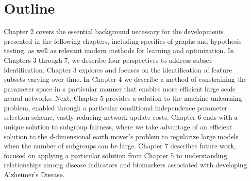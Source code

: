 \section{Outline}
Chapter 2 covers the essential background necessary for the developments presented in the following chapters, including specifics of graphs and hypothesis testing, as well as relevant modern methods for learning and optimization.
In Chapters 3 through 7, we describe four perspectives to address subset identification.
Chapter 3 explores and focuses on the identification of feature subsets varying over time.
In Chapter 4 we describe a method of constraining the parameter space in a particular manner
that enables more efficient large scale neural networks.
Next, Chapter 5 provides a solution to the machine unlearning problem,
enabled through a particular conditional independence parameter selection scheme, vastly reducing network update costs.
Chapter 6 ends with a unique solution to subgroup fairness, 
where we take advantage of an efficient solution to
the $d$-dimensional earth mover's problem
to regularize large models when the number of subgroups can be large.
{\color{red} Chapter 7 describes future work, focused on applying a particular solution from Chapter 5 to understanding relationships among
disease indicators and biomarkers associated with developing Alzheimer's Disease.}




